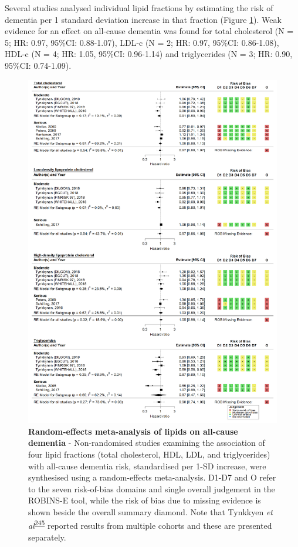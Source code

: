 \documentclass[a4paper, twoside]{templates/ociamthesis}
\begin{document}
Several studies analysed individual lipid fractions by estimating the risk of dementia per 1 standard deviation increase in that fraction (Figure \ref{fig:lipidFractionsDementia}). Weak evidence for an effect on all-cause dementia was found for total cholesterol (N = 5; HR: 0.97, 95\%CI: 0.88-1.07), LDL-c (N = 2; HR: 0.97, 95\%CI: 0.86-1.08), HDL-c (N = 4; HR: 1.05, 95\%CI: 0.96-1.14) and triglycerides (N = 3; HR: 0.90, 95\%CI: 0.74-1.09).

\newpage
\thispagestyle{empty}





\begin{figure}[H]
\includegraphics[width=1\linewidth]{figures/sys-rev/fp_lipids_composite_Dementia} \caption[Random-effects meta-analysis of lipids and all-cause dementia]{\textbf{Random-effects meta-analysis of lipids on all-cause dementia} - Non-randomised studies examining the association of four lipid fractions (total cholesterol, HDL, LDL, and triglycerides) with all-cause dementia risk, standardised per 1-SD increase, were synthesised using a random-effects meta-analysis. D1-D7 and O refer to the seven risk-of-bias domains and single overall judgement in the ROBINS-E tool, while the risk of bias due to missing evidence is shown beside the overall summary diamond. Note that Tynkkyen \emph{et al}\textsuperscript{\protect\hyperlink{ref-tynkkynen2018}{245}} reported results from multiple cohorts and these are presented separately.}\label{fig:lipidFractionsDementia}
\end{figure}
\end{document}
